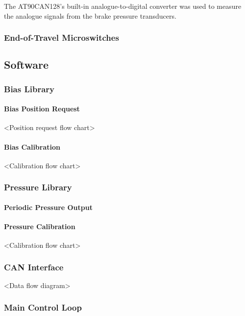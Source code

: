 The AT90CAN128's built-in analogue-to-digital converter was used to measure the analogue signals from the brake pressure transducers.

\subsubsection{End-of-Travel Microswitches}


\subsection{Software}


\subsubsection{Bias Library}


\paragraph{Bias Position Request}

<Position request flow chart>


\paragraph{Bias Calibration}

<Calibration flow chart>


\subsubsection{Pressure Library}


\paragraph{Periodic Pressure Output}


\paragraph{Pressure Calibration}

<Calibration flow chart>


\subsubsection{CAN Interface}

<Data flow diagram>


\subsubsection{Main Control Loop}